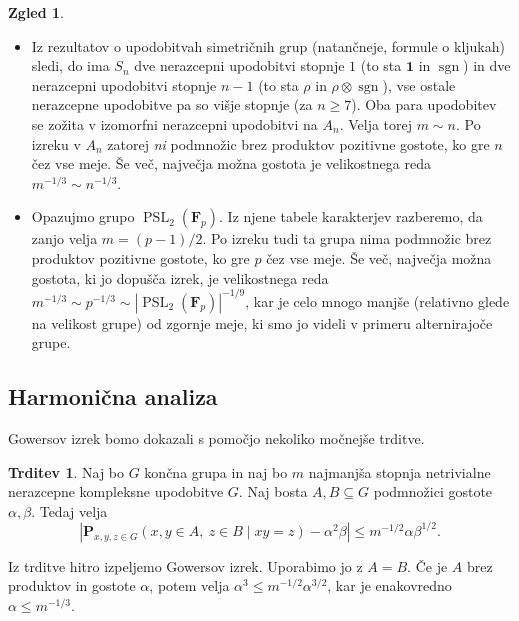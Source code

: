 \documentclass[11pt]{book}
\def\11{\mathbf{1}}
\def\FF{\mathbf{F}}
\def\PP{\mathbf{P}}
\DeclareMathOperator\sgn{sgn}
\DeclareMathOperator\PSL{PSL}
\theoremstyle{definition}
\theoremstyle{zgled}
\newtheorem*{zgled}{Zgled}
\theoremstyle{odprtproblem}
\theoremstyle{domacanaloga}
\theoremstyle{izrek}
\newtheorem*{trditev}{Trditev}
\begin{document}
\begin{zgled} \leavevmode
\begin{itemize}
    \item Iz rezultatov o upodobitvah simetričnih grup (natančneje, formule o kljukah) sledi, do ima $S_n$ dve nerazcepni upodobitvi stopnje $1$ (to sta $\11$ in $\sgn$) in dve nerazcepni upodobitvi stopnje $n-1$ (to sta $\rho$ in $\rho \otimes \sgn$), vse ostale nerazcepne upodobitve pa so višje stopnje (za $n \geq 7$). Oba para upodobitev se zožita v izomorfni nerazcepni upodobitvi na $A_n$. Velja torej $m \sim n$. Po izreku v $A_n$ zatorej \emph{ni} podmnožic brez produktov pozitivne gostote, ko gre $n$ čez vse meje. Še več, največja možna gostota je velikostnega reda $m^{-1/3} \sim n^{-1/3}$.

    \item Opazujmo grupo $\PSL_2(\FF_p)$. Iz njene tabele karakterjev razberemo, da zanjo velja $m = (p-1)/2$. Po izreku tudi ta grupa nima podmnožic brez produktov pozitivne gostote, ko gre $p$ čez vse meje. Še več, največja možna gostota, ki jo dopušča izrek, je velikostnega reda $m^{-1/3} \sim p^{-1/3} \sim |\PSL_2(\FF_p)|^{-1/9}$, kar je celo mnogo manjše (relativno glede na velikost grupe) od zgornje meje, ki smo jo videli v primeru alternirajoče grupe.
\end{itemize}
\end{zgled}

\subsection{Harmonična analiza}

Gowersov izrek bomo dokazali s pomočjo nekoliko močnejše trditve.

\begin{trditev}
Naj bo $G$ končna grupa in naj bo $m$ najmanjša stopnja netrivialne nerazcepne kompleksne upodobitve $G$. Naj bosta $A,B \subseteq G$ podmnožici gostote $\alpha, \beta$. Tedaj velja
\[
    \left| 
        \PP_{x,y,z \in G}(x,y \in A, \ z \in B \mid xy = z) - \alpha^2 \beta
    \right| 
    \leq
    m^{-1/2} \alpha \beta^{1/2}.
\]
\end{trditev}

Iz trditve hitro izpeljemo Gowersov izrek. Uporabimo jo z $A=B$. Če je $A$ brez produktov in gostote $\alpha$, potem velja $\alpha^3 \leq m^{-1/2} \alpha^{3/2}$, kar je enakovredno $\alpha \leq m^{-1/3}$.
\end{document}
